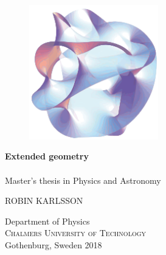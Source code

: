 
\begin{titlepage}
			
\addtolength{\voffset}{2cm}

\begin{figure}[H]
\centering
\vspace{2cm}	%
\includegraphics[width=0.5\textwidth]{figure/CB.png}
\end{figure}

\newcommand{\headtitle}{Extended geometry}
\newcommand{\subtitle}{An algebraic approach to the symmetries of M-theory}


\mbox{}
\vfill
\renewcommand{\familydefault}{\sfdefault} \normalfont %
\textbf{{\Huge 	\headtitle}} 	\\[0.5cm]
{\Large }\\[0.5cm]
Master's thesis in Physics and Astronomy \setlength{\parskip}{1cm}

{\Large ROBIN KARLSSON} \setlength{\parskip}{2.9cm}

Department of Physics \\
\textsc{Chalmers University of Technology} \\
Gothenburg, Sweden 2018

\renewcommand{\familydefault}{\rmdefault} \normalfont %
\end{titlepage}


\newpage
\restoregeometry
\thispagestyle{empty}
\mbox{}


